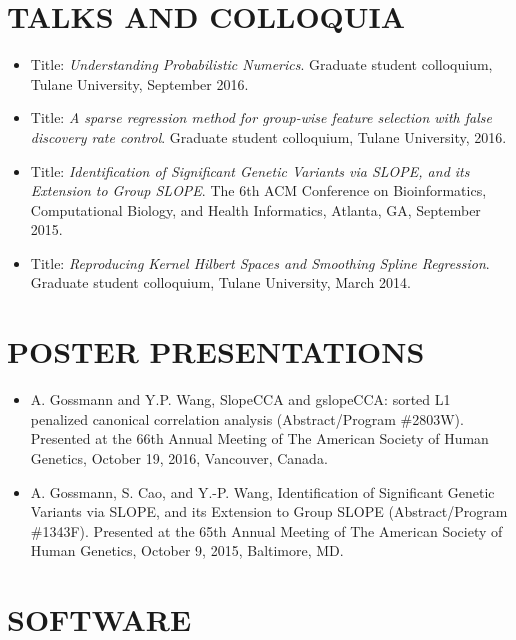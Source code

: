 \documentclass[margin]{res} %
\begin{document}
\begin{resume}
\section{TALKS AND COLLOQUIA}

\begin{itemize} \itemsep -2pt %
    \item Title: {\it Understanding Probabilistic Numerics}. Graduate student colloquium, Tulane University, September 2016.
    \item Title: {\it A sparse regression method for group-wise feature selection with false discovery rate control}. Graduate student colloquium, Tulane University, 2016.
    \item Title: {\it Identification of Significant Genetic Variants via SLOPE, and its Extension to Group SLOPE}. The 6th ACM Conference on Bioinformatics, Computational Biology, and Health Informatics, Atlanta, GA, September 2015.
    \item Title: {\it Reproducing Kernel Hilbert Spaces and Smoothing Spline Regression}. Graduate student colloquium, Tulane University, March 2014.
\end{itemize}

\section{POSTER PRESENTATIONS}

\begin{itemize} \itemsep -2pt %
    \item A. Gossmann and Y.P. Wang, SlopeCCA and gslopeCCA: sorted L1 penalized canonical correlation analysis (Abstract/Program \#2803W). Presented at the 66th Annual Meeting of The American Society of Human Genetics, October 19, 2016, Vancouver, Canada.
    \item A. Gossmann, S. Cao, and Y.-P. Wang, Identification of Significant Genetic Variants via SLOPE, and its Extension to Group SLOPE (Abstract/Program \#1343F). Presented at the 65th Annual Meeting of The American Society of Human Genetics, October 9, 2015, Baltimore, MD.
\end{itemize}

\section{SOFTWARE}


\end{resume}
\end{document}
